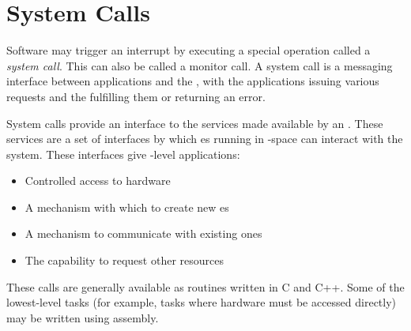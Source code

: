 \section{System Calls}\label{sec:System_Calls}
\begin{definition}\label{def:System_Call}
  Software may trigger an interrupt by executing a special operation called a \emph{system call}.
  This can also be called a monitor call.
  A system call is a messaging interface between applications and the , with the applications issuing various requests and the  fulfilling them or returning an error.

  System calls provide an interface to the services made available by an .
  These services are a set of interfaces by which es running in -space can interact with the system.
  These interfaces give -level applications:
  \begin{itemize}[noitemsep]
  \item Controlled access to hardware
  \item A mechanism with which to create new es
  \item A mechanism to communicate with existing ones
  \item The capability to request other  resources
  \end{itemize}

  These calls are generally available as routines written in C and C++.
  Some of the lowest-level tasks (for example, tasks where hardware must be accessed directly) may be written using assembly.

\end{definition}

